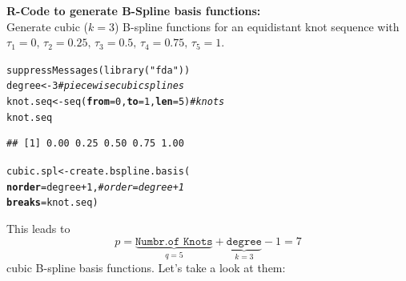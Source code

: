 \documentclass[14pt]{extreport}\usepackage[]{graphicx}\usepackage[]{xcolor}
\makeatletter
\newcommand{\hlnum}[1]{\textcolor[rgb]{0.69,0.494,0}{#1}}%
\newcommand{\hlstr}[1]{\textcolor[rgb]{0.749,0.012,0.012}{#1}}%
\newcommand{\hlcom}[1]{\textcolor[rgb]{0.514,0.506,0.514}{\textit{#1}}}%
\newcommand{\hlopt}[1]{\textcolor[rgb]{0,0,0}{#1}}%
\newcommand{\hlstd}[1]{\textcolor[rgb]{0,0,0}{#1}}%
\newcommand{\hlkwb}[1]{\textcolor[rgb]{0,0.341,0.682}{#1}}%
\newcommand{\hlkwc}[1]{\textcolor[rgb]{0,0,0}{\textbf{#1}}}%
\newcommand{\hlkwd}[1]{\textcolor[rgb]{0.004,0.004,0.506}{#1}}%
\newenvironment{kframe}{%
 \def\at@end@of@kframe{}%
 \ifinner\ifhmode%
  \def\at@end@of@kframe{\end{minipage}}%
  \begin{minipage}{\columnwidth}%
 \fi\fi%
 \def\FrameCommand##1{\hskip\@totalleftmargin \hskip-\fboxsep
 \colorbox{shadecolor}{##1}\hskip-\fboxsep
     \hskip-\linewidth \hskip-\@totalleftmargin \hskip\columnwidth}%
 \MakeFramed {\advance\hsize-\width
   \@totalleftmargin\z@ \linewidth\hsize
   \@setminipage}}%
 {\par\unskip\endMakeFramed%
 \at@end@of@kframe}
\newenvironment{knitrout}{}{} %
\makeatother
\begin{document}
\textbf{R-Code to generate B-Spline basis functions:}\\
Generate cubic ($k=3$) B-spline functions for an equidistant knot sequence
with $\tau_1=0,\,\tau_2=0.25,\,\tau_3=0.5,\,\tau_4=0.75,\,\tau_5=1$.
\begin{knitrout}
\color{fgcolor}\begin{kframe}
\begin{alltt}
\hlkwd{suppressMessages}\hlstd{(}\hlkwd{library}\hlstd{(}\hlstr{"fda"}\hlstd{))}
\hlstd{degree}   \hlkwb{<-} \hlnum{3} \hlcom{# piecewise cubic splines}
\hlstd{knot.seq} \hlkwb{<-} \hlkwd{seq}\hlstd{(}\hlkwc{from}\hlstd{=}\hlnum{0}\hlstd{,}\hlkwc{to}\hlstd{=}\hlnum{1}\hlstd{,}\hlkwc{len}\hlstd{=}\hlnum{5}\hlstd{)}\hlcom{# knots}
\hlstd{knot.seq}
\end{alltt}
\begin{verbatim}
## [1] 0.00 0.25 0.50 0.75 1.00
\end{verbatim}
\begin{alltt}
\hlstd{cubic.spl} \hlkwb{<-} \hlkwd{create.bspline.basis}\hlstd{(}
             \hlkwc{norder} \hlstd{= degree} \hlopt{+} \hlnum{1}\hlstd{,} \hlcom{# order=degree+1  }
             \hlkwc{breaks} \hlstd{= knot.seq)}
\end{alltt}
\end{kframe}
\end{knitrout}

This leads to 
$$
p=\underbrace{\texttt{Numbr.of Knots}}_{q=5} + \underbrace{\texttt{degree}}_{k=3} - 1=7
$$ 
cubic B-spline basis functions. Let's take a look at them:
\end{document}
